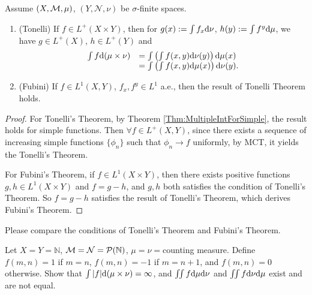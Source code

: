 \begin{thm}
    \label{Thm:Fubini}
    Assume $(X,\mathcal{M},\mu)$, $(Y,\mathcal{N},\nu)$ be 
    $\sigma$-finite spaces. 
    \begin{enumerate}
        \item (Tonelli) If $f\in L^{+}(X\times Y)$, then for 
        $g(x):=\int f_{x}\mathrm{d}\nu$, $h(y):=\int f^{y}\mathrm{d}\mu$, 
        we have $g\in L^{+}(X)$, $h\in L^{+}(Y)$ and 
        \begin{displaymath}
            \begin{array}{rl}
            \int f\mathrm{d}(\mu\times\nu)&=
            \int\left(\int f(x,y)\mathrm{d}\nu(y)\right)\mathrm{d}\mu(x)\\
            &=\int\left(\int f(x,y)\mathrm{d}\mu(x)\right)\mathrm{d}\nu(y).
            \end{array}
        \end{displaymath}
        \item (Fubini) If $f\in L^{1}(X,Y)$, $f_{x},f^{y}\in L^{1}$ 
        a.e., then the result of Tonelli Theorem holds.
    \end{enumerate}
\end{thm}
\begin{proof}
    For Tonelli's Theorem, by Theorem \ref{Thm:MultipleIntForSimple}, 
    the result holds for simple functions. 
    Then $\forall f\in L^{+}(X,Y)$, since there exists a sequence of 
    increasing simple functions $\{\phi_{n}\}$ such that 
    $\phi_{n}\rightarrow f$ uniformly, by MCT, it yields the 
    Tonelli's Theorem. 

    For Fubini's Theorem, if $f\in L^{1}(X\times Y)$, then 
    there exists positive functions $g,h\in L^{1}(X\times Y)$ and 
    $f=g-h$, and $g,h$ both satisfies the condition of 
    Tonelli's Theorem. So $f=g-h$ satisfies the result of 
    Tonelli's Theorem, which derives Fubini's Theorem.
\end{proof}
\begin{rem}
    Please compare the conditions of Tonelli's Theorem 
    and Fubini's Theorem. 
\end{rem}
\begin{exc}
    Let $X=Y=\mathbb{N}$, $\mathcal{M}=\mathcal{N}=\mathcal{P}(\mathbb{N})$, 
    $\mu=\nu=$counting measure. Define $f(m,n)=1$ if $m=n$, 
    $f(m,n)=-1$ if $m=n+1$, and $f(m,n)=0$ otherwise. Show that 
    $\int |f|\mathrm{d}(\mu\times\nu)=\infty$, and 
    $\iint f\mathrm{d}\mu\mathrm{d}\nu$ and $\iint f\mathrm{d}\nu\mathrm{d}\mu$ exist and 
    are not equal.
\end{exc}
